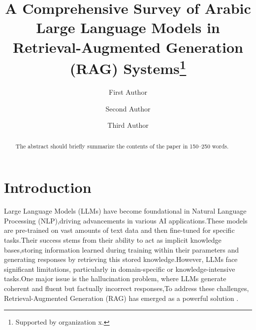 \documentclass[runningheads]{llncs}
\begin{document}
%
\title{A Comprehensive Survey of Arabic Large Language Models in Retrieval-Augmented Generation (RAG) Systems\thanks{Supported by organization x.}}
%
%
\author{First Author \and
Second Author \and
Third Author}
%
%
%
\maketitle              %
%
\begin{abstract}
The abstract should briefly summarize the contents of the paper in
150--250 words.

\end{abstract}
%
%
%
\section{Introduction}
Large Language Models (LLMs) have become foundational in Natural Language Processing (NLP),driving advancements in various AI applications.These models are pre-trained  on vast amounts of text data and then fine-tuned for specific tasks.Their success stems from their ability to act as implicit knowledge  bases\cite{ref_AlKhamissi2022},storing information learned during training within their parameters and generating responses by retrieving this stored knowledge.However, LLMs face significant limitations, particularly in domain-specific\cite{Singhal2023} or knowledge-intensive tasks\cite{ref_proc2}.One major issue is the hallucination\cite{Zhang2023} problem, where LLMs generate coherent and fluent but factually incorrect responses,To address these challenges, Retrieval-Augmented Generation (RAG)\cite{Lewis2020} has emerged as a powerful solution .
\end{document}
